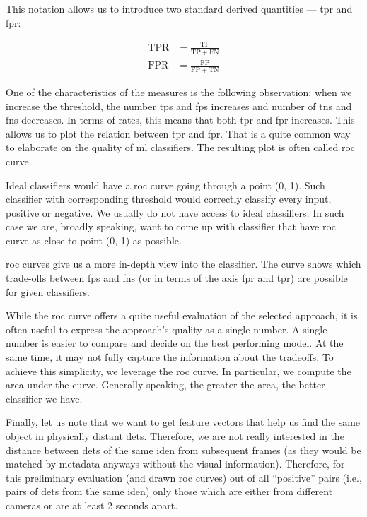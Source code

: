 This notation allows us to introduce two standard derived quantities --- \gls{tpr} and \gls{fpr}:

\begin{align*}
    \mathrm{TPR} &= \frac{\mathrm{TP}}{\mathrm{TP} + \mathrm{FN}} \\
    \mathrm{FPR} &= \frac{\mathrm{FP}}{\mathrm{FP} + \mathrm{TN}}
\end{align*}

One of the characteristics of the measures is the following observation:
when we increase the threshold, the number \glspl{tp} and \glspl{fp} increases and  number of \glspl{tn} and \glspl{fn} decreases. In terms of rates, this means that both \gls{tpr} and \gls{fpr} increases. This allows us to plot the relation between \gls{tpr} and \gls{fpr}. That is a quite common way to elaborate on the quality of \gls{ml} classifiers. The resulting plot is often called \gls{roc} curve.

Ideal classifiers would have a \gls{roc} curve going through a point
(0, 1). Such classifier with corresponding threshold would correctly
classify every input, positive or negative. We usually do not
have access to ideal classifiers. In such case we are, broadly speaking,
want to come up with classifier that have \gls{roc} curve as close to
point (0, 1) as possible.

\gls{roc} curves give us a more in-depth view into the classifier.
The curve shows which trade-offs between \glspl{fp} and \glspl{fn} (or in terms
of the axis \gls{fpr} and \gls{tpr}) are possible for given classifiers.

While the \gls{roc} curve offers a quite useful evaluation of the
selected approach, it is often useful to express the approach's quality as a single number. A single number is easier to compare and decide on the best performing model. At the same time, it may not fully capture the information about the tradeoffs. To achieve this simplicity, we leverage the \gls{roc} curve.
In particular, we compute the area under the curve. Generally speaking, the greater
the area, the better classifier we have.

Finally, let us note that we want to get feature vectors that help us find the same object in physically distant \glspl{det}. Therefore, we are not really interested in the distance between \glspl{det} of the same \gls{iden} from subsequent frames (as they would be matched by metadata anyways without the visual information). Therefore, for this preliminary evaluation (and drawn \gls{roc} curves) out of all ``positive'' pairs (i.e., pairs of \glspl{det} from the same \gls{iden}) only those which are either from different cameras or are at least 2 seconds apart.

